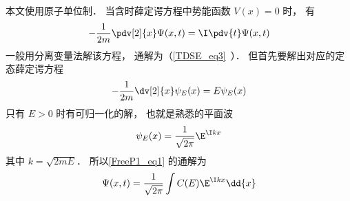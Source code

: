 

本文使用原子单位制． 当含时薛定谔方程中势能函数 $V(x) = 0$ 时， 有
\begin{equation}\label{FreeP1_eq1}
-\frac{1}{2m}\pdv[2]{x}\Psi(x,t) = \I \pdv{t} \Psi(x,t)
\end{equation}
一般用分离变量法解该方程， 通解为（\autoref{TDSE_eq3}~）． 但首先要解出对应的定态薛定谔方程
\begin{equation}
-\frac{1}{2m}\dv[2]{x}\psi_E(x) = E \psi_E(x)
\end{equation}
只有 $E > 0$ 时有可归一化的解， 也就是熟悉的平面波
\begin{equation}
\psi_E(x) = \frac{1}{\sqrt{2\pi}} \E^{\I k x}
\end{equation}
其中 $k = \sqrt{2mE}$． 所以\autoref{FreeP1_eq1} 的通解为
\begin{equation}
\Psi(x,t) = \frac{1}{\sqrt{2\pi}} \int C(E) \E^{\I k x} \dd{x}
\end{equation}

